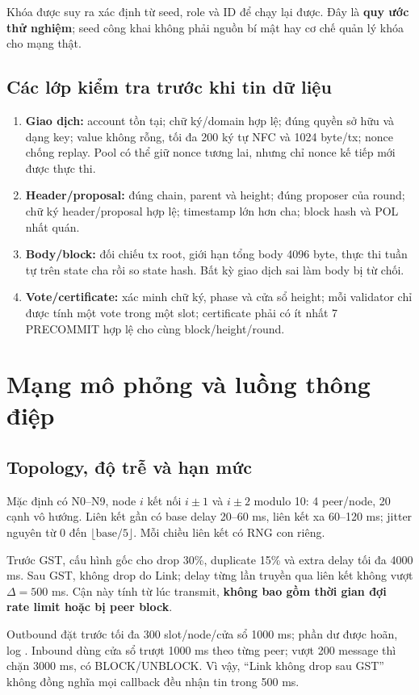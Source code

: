 \documentclass[11pt,a4paper]{article}
\newcommand{\code}[1]{\texttt{\detokenize{#1}}}
\newcommand{\key}[1]{\textbf{\color{navy}#1}}
\newcommand{\nextpage}{\clearpage}
\begin{document}
Khóa được suy ra xác định từ seed, role và ID để chạy lại được. Đây là \textbf{quy ước thử nghiệm}; seed công khai không phải nguồn bí mật hay cơ chế quản lý khóa cho mạng thật.

\subsection{Các lớp kiểm tra trước khi tin dữ liệu}
\begin{enumerate}
\item \key{Giao dịch:} account tồn tại; chữ ký/domain hợp lệ; đúng quyền sở hữu và dạng key; value không rỗng, tối đa 200 ký tự NFC và 1024 byte/tx; nonce chống replay. Pool có thể giữ nonce tương lai, nhưng chỉ nonce kế tiếp mới được thực thi.
\item \key{Header/proposal:} đúng chain, parent và height; đúng proposer của round; chữ ký header/proposal hợp lệ; timestamp lớn hơn cha; block hash và POL nhất quán.
\item \key{Body/block:} đối chiếu tx root, giới hạn tổng body 4096 byte, thực thi tuần tự trên state cha rồi so state hash. Bất kỳ giao dịch sai làm body bị từ chối.
\item \key{Vote/certificate:} xác minh chữ ký, phase và cửa sổ height; mỗi validator chỉ được tính một vote trong một slot; certificate phải có ít nhất 7 PRECOMMIT hợp lệ cho cùng block/height/round.
\end{enumerate}

\nextpage
\section{Mạng mô phỏng và luồng thông điệp}
\subsection{Topology, độ trễ và hạn mức}
Mặc định có N0--N9, node $i$ kết nối $i\pm1$ và $i\pm2$ modulo 10: 4 peer/node, 20 cạnh vô hướng. Liên kết gần có base delay 20--60 ms, liên kết xa 60--120 ms; jitter nguyên từ 0 đến $\lfloor\text{base}/5\rfloor$. Mỗi chiều liên kết có RNG con riêng.

Trước GST, cấu hình gốc cho drop 30\%, duplicate 15\% và extra delay tối đa 4000 ms. Sau GST, không drop do Link; delay từng lần truyền qua liên kết không vượt $\Delta=500$ ms. Cận này tính từ lúc transmit, \textbf{không bao gồm thời gian đợi rate limit hoặc bị peer block}.

Outbound đặt trước tối đa 300 slot/node/cửa sổ 1000 ms; phần dư được hoãn, log \code{DELAY reason=RATE_LIMIT}. Inbound dùng cửa sổ trượt 1000 ms theo từng peer; vượt 200 message thì chặn 3000 ms, có BLOCK/UNBLOCK. Vì vậy, ``Link không drop sau GST'' không đồng nghĩa mọi callback đều nhận tin trong 500 ms.
\end{document}
